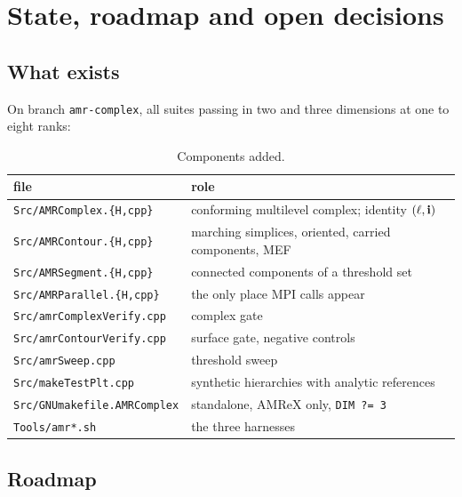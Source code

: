 \chapter{State, roadmap and open decisions}
\label{ch:roadmap}

\section{What exists}

On branch \texttt{amr-complex}, all suites passing in two and three dimensions
at one to eight ranks:

\begin{table}[htbp]
\centering
\caption{Components added.}
\label{tab:files}
\begin{tabular}{p{}p{}}
\toprule
file & role \\
\midrule
\texttt{Src/AMRComplex.\{H,cpp\}} &
  conforming multilevel complex; identity $(\ell,\mathbf{i})$ \\
\texttt{Src/AMRContour.\{H,cpp\}} &
  marching simplices, oriented, carried components, MEF \\
\texttt{Src/AMRSegment.\{H,cpp\}} &
  connected components of a threshold set \\
\texttt{Src/AMRParallel.\{H,cpp\}} &
  the only place MPI calls appear \\
\texttt{Src/amrComplexVerify.cpp} &
  complex gate \\
\texttt{Src/amrContourVerify.cpp} &
  surface gate, negative controls \\
\texttt{Src/amrSweep.cpp} &
  threshold sweep \\
\texttt{Src/makeTestPlt.cpp} &
  synthetic hierarchies with analytic references \\
\texttt{Src/GNUmakefile.AMRComplex} &
  standalone, AMReX only, \texttt{DIM ?= 3} \\
\texttt{Tools/amr*.sh} &
  the three harnesses \\
\bottomrule
\end{tabular}
\end{table}

\section{Roadmap}


